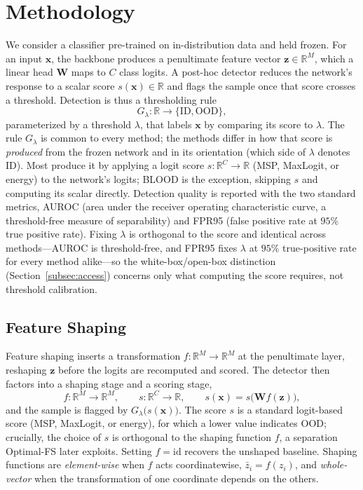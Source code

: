 \documentclass[a4paper]{article}
\begin{document}
\section{Methodology}
\label{sec:methodology}

We consider a classifier pre-trained on in-distribution data and held frozen.
For an input $\mathbf{x}$, the backbone produces a penultimate feature vector
$\mathbf{z} \in \mathbb{R}^{M}$, which a linear head $\mathbf{W}$ maps to $C$ class
logits. A post-hoc detector reduces the network's response to a scalar score
$s(\mathbf{x}) \in \mathbb{R}$ and flags the sample once that score crosses a
threshold. Detection is thus a thresholding rule
\begin{equation}
G_\lambda : \mathbb{R} \to \{\text{ID}, \text{OOD}\},
\end{equation}
parameterized by a threshold $\lambda$, that labels $\mathbf{x}$ by comparing its score
to $\lambda$. The rule $G_\lambda$ is common to every method; the methods differ in how
that score is \emph{produced} from the frozen network and in its orientation (which
side of $\lambda$ denotes ID). Most produce it by applying a logit score
$s : \mathbb{R}^{C} \to \mathbb{R}$ (MSP, MaxLogit, or energy) to the network's logits;
BLOOD is the exception, skipping $s$ and computing its scalar directly. Detection quality is reported
with the two standard metrics, AUROC (area under the receiver operating characteristic
curve, a threshold-free measure of separability) and FPR95 (false positive rate at
$95\%$ true positive rate). Fixing $\lambda$ is orthogonal to the score and identical
across methods---AUROC is threshold-free, and FPR95 fixes $\lambda$ at $95\%$
true-positive rate for every method alike---so the white-box/open-box distinction
(Section~\ref{subsec:access}) concerns only what computing the score requires, not
threshold calibration.

\subsection{Feature Shaping}
\label{subsec:shaping}

Feature shaping inserts a transformation $f : \mathbb{R}^{M} \to \mathbb{R}^{M}$ at
the penultimate layer, reshaping $\mathbf{z}$ before the logits are recomputed and
scored. The detector then factors into a shaping stage and a scoring stage,
\begin{equation}
f : \mathbb{R}^{M} \to \mathbb{R}^{M}, \qquad
s : \mathbb{R}^{C} \to \mathbb{R}, \qquad
s(\mathbf{x}) = s\big(\mathbf{W} f(\mathbf{z})\big),
\end{equation}
and the sample is flagged by $G_\lambda\big(s(\mathbf{x})\big)$.
The score $s$ is a standard logit-based score (MSP, MaxLogit, or energy), for which
a lower value indicates OOD; crucially, the choice of $s$ is orthogonal to the
shaping function $f$, a separation Optimal-FS later exploits. Setting
$f = \mathrm{id}$ recovers the unshaped baseline. Shaping functions are
\emph{element-wise} when $f$ acts coordinatewise, $\bar{z}_i = f(z_i)$, and
\emph{whole-vector} when the transformation of one coordinate depends on the others.
\end{document}
